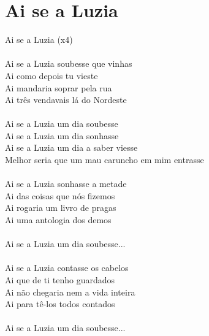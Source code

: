 \documentclass{article}
\begin{document}
\section{ Ai se a Luzia}
Ai se a Luzia (x4)\\
\\
Ai se a Luzia soubesse que vinhas\\
Ai como depois tu vieste\\
Ai mandaria soprar pela rua\\
Ai três vendavais lá do Nordeste\\
\\
Ai se a Luzia um dia soubesse\\
Ai se a Luzia um dia sonhasse\\
Ai se a Luzia um dia a saber viesse\\
Melhor seria que um mau caruncho em mim entrasse\\
\\
Ai se a Luzia sonhasse a metade\\
Ai das coisas que nós fizemos\\
Ai rogaria um livro de pragas\\
Ai uma antologia dos demos\\
\\
Ai se a Luzia um dia soubesse...\\
\\
Ai se a Luzia contasse os cabelos \\
Ai que de ti tenho guardados\\
Ai não chegaria nem a vida inteira\\
Ai para tê-los todos contados\\
\\
Ai se a Luzia um dia soubesse...\\
\end{document}
